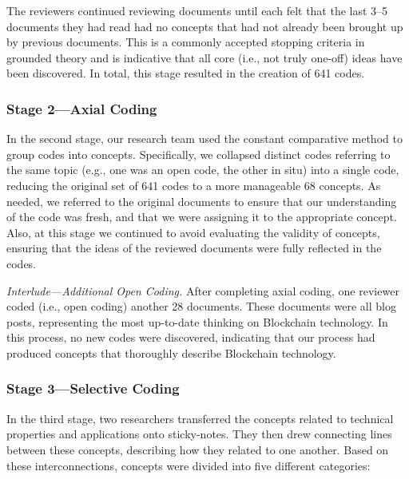 The reviewers continued reviewing documents until each felt that the last 3--5 documents they had read had no concepts that had not already been brought up by previous documents.
This is a commonly accepted stopping criteria in grounded theory and is indicative that all core (i.e., not truly one-off) ideas have been discovered.
In total, this stage resulted in the creation of 641 codes.

\subsubsection{Stage 2---Axial Coding}
In the second stage, our research team used the constant comparative method to group codes into concepts.
Specifically, we collapsed distinct codes referring to the same topic (e.g., one was an open code, the other in situ) into a single code, reducing the original set of 641 codes to a more manageable 68 concepts.
As needed, we referred to the original documents to ensure that our understanding of the code was fresh, and that we were assigning it to the appropriate concept.
Also, at this stage we continued to avoid evaluating the validity of concepts, ensuring that the ideas of the reviewed documents were fully reflected in the codes.

\textit{Interlude---Additional Open Coding.}
After completing axial coding, one reviewer coded (i.e., open coding) another 28 documents.
These documents were all blog posts, representing the most up-to-date thinking on Blockchain technology.
In this process, no new codes were discovered, indicating that our process had produced concepts that thoroughly describe Blockchain technology.

\subsubsection{Stage 3---Selective Coding}
In the third stage, two researchers transferred the concepts related to technical properties and applications onto sticky-notes.
They then drew connecting lines between these concepts, describing how they related to one another.
Based on these interconnections, concepts were divided into five different categories:

